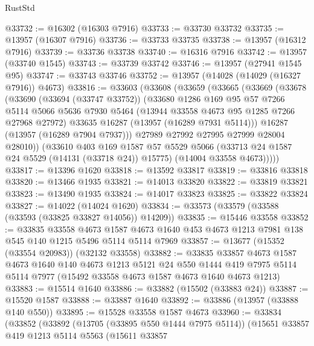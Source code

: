 \begin{lexlean}{RustStd}
\begin{coremodule}
@33732 := @16302 (@16303 @7916)
@33733 := @33730 @33732
@33735 := @13957 (@16307 @7916)
@33736 := @33733 @33735
@33738 := @13957 (@16312 @7916)
@33739 := @33736 @33738
@33740 := @16316 @7916
@33742 := @13957 (@33740 @1545)
@33743 := @33739 @33742
@33746 := @13957 (@27941 @1545 @95)
@33747 := @33743 @33746
@33752 := @13957 (@14028 (@14029 (@16327 @7916)) @4673)
@33816 := @33603
    (@33608
      (@33659
        (@33665
          (@33669
            (@33678
              (@33690
                (@33694 (@33747 @33752))
                (@33680
                  @1286
                  @169
                  @95
                  @57
                  @7266
                  @5114
                  @5066
                  @5636
                  @7930
                  @5464
                  (@13944 @33558 @4673 @95 @1285 @7266 @27968 @27972)
                  @33635
                  @16287
                  (@13957 (@16289 @7931 @5114)))
                @16287
                (@13957 (@16289 @7904 @7937)))
              @27989
              @27992
              @27995
              @27999
              @28004
              @28010))
          (@33610
            @403
            @169
            @1587
            @57
            @5529
            @5066
            (@33713 @24 @1587 @24 @5529 (@14131 (@33718 @24)) @15775)
            (@14004 @33558 @4673)))))
@33817 := @13396 @1620
@33818 := @13592 @33817
@33819 := @33816 @33818
@33820 := @13466 @1935
@33821 := @14013 @33820
@33822 := @33819 @33821
@33823 := @13490 @1935
@33824 := @14017 @33823
@33825 := @33822 @33824
@33827 := @14022 (@14024 @1620)
@33834 := @33573 (@33579 (@33588 (@33593 (@33825 @33827 @14056)) @14209))
@33835 := @15446 @33558
@33852 := @33835
    @33558
    @4673
    @1587
    @4673
    @1640
    @453
    @4673
    @1213
    @7981
    @138
    @545
    @140
    @1215
    @5496
    @5114
    @5114
    @7969
@33857 := @13677 (@15352 (@33554 @20983)) (@32132 @33558)
@33882 := @33835
    @33857
    @4673
    @1587
    @4673
    @1640
    @140
    @4673
    @1213
    @5121
    @24
    @550
    @1444
    @419
    @7975
    @5114
    @5114
    @7977
    (@15492 @33558 @4673 @1587 @4673 @1640 @4673 @1213)
@33883 := @15514 @1640
@33886 := @33882 (@15502 (@33883 @24))
@33887 := @15520 @1587
@33888 := @33887 @1640
@33892 := @33886 (@13957 (@33888 @140 @550))
@33895 := @15528 @33558 @1587 @4673
@33960 := @33834
    (@33852
      (@33892
        (@13705 (@33895 @550 @1444 @7975 @5114))
        (@15651
          @33857
          @419
          @1213
          @5114
          @5563
          (@15611
            @33857

\end{coremodule}
\end{lexlean}
